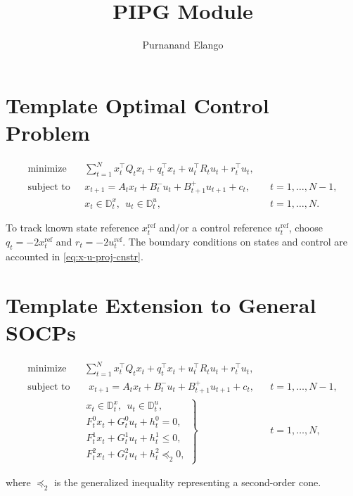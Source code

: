 \documentclass[letterpaper,11pt]{article}
\title{PIPG Module}
\author{Purnanand Elango}
\begin{document}
\maketitle 

\section{Template Optimal Control Problem}

\begin{subequations}
\begin{align}
    \operatorname{minimize}~~&~\sum_{t=1}^Nx_t^\top Q_t x_t +q_t^\top x_t + u_t^\top R_t u_t + r_t^\top u_t,\\
    \operatorname{subject~to}~~&~x_{t+1} = A_t x_t + B_t^{-}u_t + B_{t+1}^+u_{t+1} + c_t, & & t = 1,\ldots,N-1,\\
    &~x_t\in\mathbb{D}^x_t,~~u_t \in \mathbb{D}^u_t, & & t = 1,\ldots, N.\label{eq:x-u-proj-cnstr}  
\end{align}\label{prb:template-ocp}%
\end{subequations}

To track known state reference $x_t^{\text{ref}}$ and/or a control reference $u^{\text{ref}}_t$, choose $q_t = -2x_t^{\text{ref}}$ and $r_t = -2u^{\text{ref}}_t$. The boundary conditions on states and control are accounted in \eqref{eq:x-u-proj-cnstr}.

\section{Template Extension to General SOCPs}

\begin{align*}
    \operatorname{minimize}~~&~\sum_{t=1}^Nx_t^\top Q_t x_t +q_t^\top x_t + u_t^\top R_t u_t + r_t^\top u_t,\\
    \operatorname{subject~to}~~&~~~x_{t+1} = A_t x_t + B_t^{-}u_t + B_{t+1}^+u_{t+1} + c_t, & & t = 1,\ldots,N-1,\\
        & \left. \begin{array}{l} 
        x_t\in\mathbb{D}^x_t,~~u_t \in \mathbb{D}^u_t,\\[0.1cm]
        F^0_t x_t + G^0_t u_t + h^0_t = 0, \\[0.1cm]
        F^1_t x_t + G^1_t u_t + h^1_t \le 0, \\[0.1cm]
        F^2_t x_t + G^2_t u_t + h^2_t \preceq_{2} 0 , \end{array} \right\} & & t = 1,\ldots, N,  
\end{align*}

where $\preceq_2$ is the generalized inequality representing a second-order cone.
\end{document}
